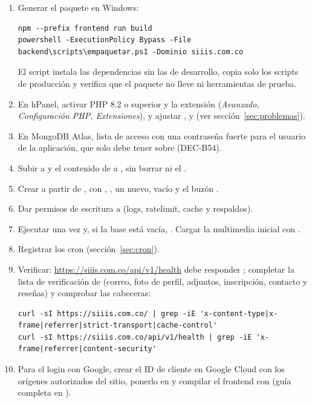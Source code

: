 \documentclass[11pt,a4paper]{article}
\begin{document}
\begin{enumerate}
  \item Generar el paquete en Windows:
\begin{lstlisting}[style=powershell]
npm --prefix frontend run build
powershell -ExecutionPolicy Bypass -File backend\scripts\empaquetar.ps1 -Dominio siiis.com.co
\end{lstlisting}
    El script instala las dependencias sin las de desarrollo, copia solo los scripts de producci\'on y verifica que el
    paquete no lleve  ni herramientas de prueba.
  \item En hPanel, activar PHP 8.2 o superior y la extensi\'on  (\emph{Avanzado, Configuraci\'on PHP,
    Extensiones}), y ajustar ,  y  (ver
    secci\'on~\ref{sec:problemas}).
  \item En MongoDB Atlas, lista de acceso  con una contrase\~na fuerte para el usuario de la aplicaci\'on,
    que solo debe tener  sobre  (DEC-B54).
  \item Subir  a  y el contenido de
     a , sin borrar  ni el .
  \item Crear  a partir de , con ,
    , un  nuevo,  vac\'io y el buz\'on
    .
  \item Dar permisos de escritura a  (logs, ratelimit, cache y respaldos).
  \item Ejecutar una vez  y, si la base est\'a vac\'ia,
    . Cargar la multimedia inicial con .
  \item Registrar los cron (secci\'on~\ref{sec:cron}).
  \item Verificar: \url{https://siiis.com.co/api/v1/health} debe responder ; completar la
    lista de verificaci\'on de  (correo, foto de perfil, adjuntos, inscripci\'on, contacto y
    rese\~nas) y comprobar las cabeceras:
\begin{lstlisting}[style=bash]
curl -sI https://siiis.com.co/ | grep -iE 'x-content-type|x-frame|referrer|strict-transport|cache-control'
curl -sI https://siiis.com.co/api/v1/health | grep -iE 'x-frame|referrer|content-security'
\end{lstlisting}
  \item Para el login con Google, crear el ID de cliente en Google Cloud con los or\'igenes autorizados del sitio,
    ponerlo en  y compilar el frontend con  (gu\'ia completa en
    ).
\end{enumerate}
\end{document}
